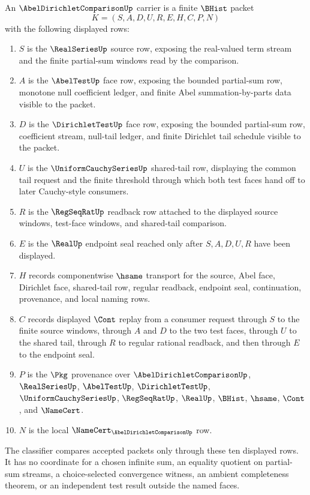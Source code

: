 \begin{definition}
\label{def:abel-dirichlet-comparison-carrier}
An $\AbelDirichletComparisonUp$ carrier is a finite $\BHist$ packet
$$
K=(S,A,D,U,R,E,H,C,P,N)
$$
with the following displayed rows:
\begin{enumerate}
\item $S$ is the $\RealSeriesUp$ source row, exposing the real-valued term stream and the finite partial-sum windows read by the comparison.
\item $A$ is the $\AbelTestUp$ face row, exposing the bounded partial-sum row, monotone null coefficient ledger, and finite Abel summation-by-parts data visible to the packet.
\item $D$ is the $\DirichletTestUp$ face row, exposing the bounded partial-sum row, coefficient stream, null-tail ledger, and finite Dirichlet tail schedule visible to the packet.
\item $U$ is the $\UniformCauchySeriesUp$ shared-tail row, displaying the common tail request and the finite threshold through which both test faces hand off to later Cauchy-style consumers.
\item $R$ is the $\RegSeqRatUp$ readback row attached to the displayed source windows, test-face windows, and shared-tail comparison.
\item $E$ is the $\RealUp$ endpoint seal reached only after $S,A,D,U,R$ have been displayed.
\item $H$ records componentwise $\hsame$ transport for the source, Abel face, Dirichlet face, shared-tail row, regular readback, endpoint seal, continuation, provenance, and local naming rows.
\item $C$ records displayed $\Cont$ replay from a consumer request through $S$ to the finite source windows, through $A$ and $D$ to the two test faces, through $U$ to the shared tail, through $R$ to regular rational readback, and then through $E$ to the endpoint seal.
\item $P$ is the $\Pkg$ provenance over $\AbelDirichletComparisonUp$, $\RealSeriesUp$, $\AbelTestUp$, $\DirichletTestUp$, $\UniformCauchySeriesUp$, $\RegSeqRatUp$, $\RealUp$, $\BHist$, $\hsame$, $\Cont$, and $\NameCert$.
\item $N$ is the local $\NameCert_{\AbelDirichletComparisonUp}$ row.
\end{enumerate}
The classifier compares accepted packets only through these ten displayed rows. It has no coordinate for a chosen infinite sum, an equality quotient on partial-sum streams, a choice-selected convergence witness, an ambient completeness theorem, or an independent test result outside the named faces.
\end{definition}

